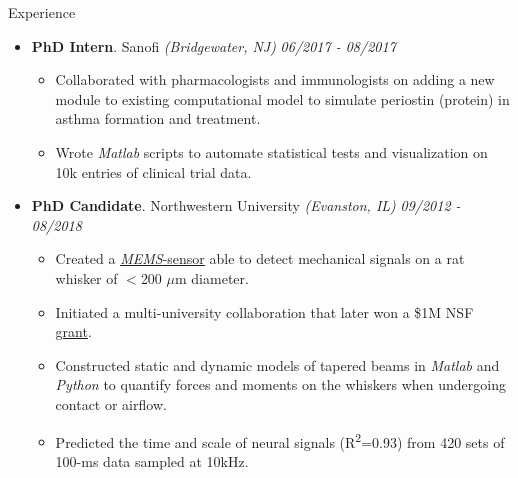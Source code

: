 \documentclass{resume} %
\begin{document}
\begin{rSection}{Experience}
\begin{itemize}[leftmargin=0em]
			\item {\bf PhD Intern}{. Sanofi \textit{(Bridgewater, NJ)}} \hfill {\em 06/2017 - 08/2017}\\
			\vspace{-5mm}
			\begin{itemize}
				\setlength\itemsep{-1.75em}	
				\item Collaborated with pharmacologists and immunologists on adding a new module to existing computational model to simulate periostin (protein) in asthma formation and treatment.\\
				\item Wrote \textit{Matlab} scripts to automate statistical tests and visualization on 10k entries of clinical trial data.
			\end{itemize}
			
			\item {\bf PhD Candidate}{. Northwestern University \textit{(Evanston, IL)}} \hfill {\em 09/2012 - 08/2018}\\
			\vspace{-5mm}
			\begin{itemize}
				\setlength\itemsep{-1.75em}
				\item Created a \href{https://www.youtube.com/watch?v=EPuThXPd-qw}{\textit{MEMS}-sensor} able to detect mechanical signals on a rat whisker of $<$200 $\mu$m diameter.\\
				\item Initiated a multi-university collaboration that later won a \$1M NSF \href{https://www.nsf.gov/news/mmg/mmg_disp.jsp?med_id=132588}{grant}.\\
				\item Constructed static and dynamic models of tapered beams in \textit{Matlab} and \textit{Python} to quantify forces and moments on the whiskers when undergoing contact or airflow.\\
				\item Predicted the time and scale of neural signals (R\textsuperscript{2}=0.93) from 420 sets of 100-ms data sampled at 10kHz.\\
			\end{itemize}
			
			
		\end{itemize}
		
	\end{rSection}
	
\end{document}
